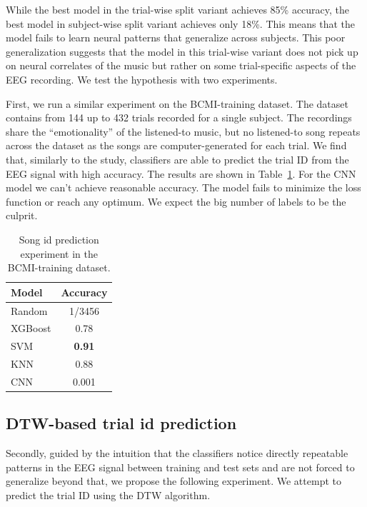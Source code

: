 While the best model in the trial-wise split variant achieves 85\% accuracy, the best model in subject-wise split variant achieves only 18\%.
This means that the model fails to learn neural patterns that generalize across subjects.
This poor generalization suggests that the model in this trial-wise variant does not pick up on neural correlates of the music but rather on some trial-specific aspects of the EEG recording.
We test the hypothesis with two experiments. 

First, we run a similar experiment on the BCMI-training dataset. The dataset contains from 144 up to 432 trials recorded for a single subject.
The recordings share the ``emotionality'' of the listened-to music, but no listened-to song repeats across the dataset as the songs are computer-generated for each trial.
We find that, similarly to the study, classifiers are able to predict the trial ID from the EEG signal with high accuracy. 
The results are shown in Table~\ref{tab:song-id-single-subject}. 
For the CNN model we can't achieve reasonable accuracy. The model fails to minimize the loss function or reach any optimum. We expect the big number of labels to be the culprit.

\begin{table}[h]
  \centering
  \begin{tabular}{|l|c|}
    \hline
    \textbf{Model} & \textbf{Accuracy} \\
    \hline
    Random  &  1/3456  \\
    XGBoost & 0.78 \\
    SVM     & \textbf{0.91} \\
    KNN     & 0.88 \\
    CNN      & 0.001    \\
    \hline
  \end{tabular}
  \caption{Song id prediction experiment in the BCMI-training dataset.}
  \label{tab:song-id-single-subject}
\end{table}

\subsection{DTW-based trial id prediction}

Secondly, guided by the intuition that the classifiers notice directly repeatable patterns in the EEG signal between training and test sets and are not forced to generalize beyond that, we propose the following experiment.
We attempt to predict the trial ID using the DTW algorithm.


